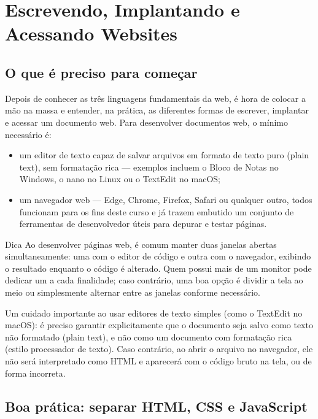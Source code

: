 \chapter{Escrevendo, Implantando e Acessando Websites}

\section{O que é preciso para começar}

Depois de conhecer as três linguagens fundamentais da web, é hora de colocar a mão na massa e entender, na prática, as diferentes formas de escrever, implantar e acessar um documento web. Para desenvolver documentos web, o mínimo necessário é:

\begin{itemize}
  \item um editor de texto capaz de salvar arquivos em formato de texto puro (plain text), sem formatação rica — exemplos incluem o Bloco de Notas no Windows, o nano no Linux ou o TextEdit no macOS;
\end{itemize}

\begin{itemize}
  \item um navegador web — Edge, Chrome, Firefox, Safari ou qualquer outro, todos funcionam para os fins deste curso e já trazem embutido um conjunto de ferramentas de desenvolvedor úteis para depurar e testar páginas.
\end{itemize}

\begin{infobox}{Dica}
Ao desenvolver páginas web, é comum manter duas janelas abertas simultaneamente: uma com o editor de código e outra com o navegador, exibindo o resultado enquanto o código é alterado. Quem possui mais de um monitor pode dedicar um a cada finalidade; caso contrário, uma boa opção é dividir a tela ao meio ou simplesmente alternar entre as janelas conforme necessário.
\end{infobox}

Um cuidado importante ao usar editores de texto simples (como o TextEdit no macOS): é preciso garantir explicitamente que o documento seja salvo como texto não formatado (plain text), e não como um documento com formatação rica (estilo processador de texto). Caso contrário, ao abrir o arquivo no navegador, ele não será interpretado como HTML e aparecerá com o código bruto na tela, ou de forma incorreta.

\section{Boa prática: separar HTML, CSS e JavaScript}

